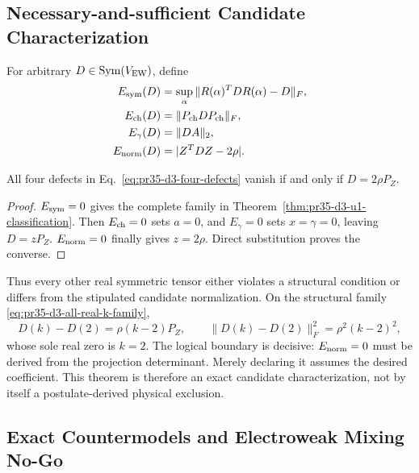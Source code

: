 \subsection{Necessary-and-sufficient Candidate Characterization}

For arbitrary $D\in\operatorname{Sym}(V_{\rm EW})$, define
\begin{align}
 E_{\rm sym}(D)&=\sup_{\alpha}
 \|R(\alpha)^TDR(\alpha)-D\|_F,\nonumber\\
 E_{\rm ch}(D)&=\|P_{\rm ch}DP_{\rm ch}\|_F,\nonumber\\
 E_{\gamma}(D)&=\|DA\|_2,\nonumber\\
 E_{\rm norm}(D)&=|Z^TDZ-2\rho|.
 \label{eq:pr35-d3-four-defects}
\end{align}

\begin{theorem}
\label{thm:pr35-d3-four-defect-certificate}
All four defects in Eq.~\eqref{eq:pr35-d3-four-defects} vanish if and only if
$D=2\rho P_Z$.
\end{theorem}

\begin{proof}
$E_{\rm sym}=0$ gives the complete family in
Theorem~\ref{thm:pr35-d3-u1-classification}.  Then $E_{\rm ch}=0$ sets $a=0$,
and $E_\gamma=0$ sets $x=\gamma=0$, leaving $D=zP_Z$.
$E_{\rm norm}=0$ finally gives $z=2\rho$.  Direct substitution proves the
converse.
\end{proof}

Thus every other real symmetric tensor either violates a structural condition
or differs from the stipulated candidate normalization.
On the structural family \eqref{eq:pr35-d3-all-real-k-family},
\begin{equation}
 D(k)-D(2)=\rho(k-2)P_Z,\qquad
 \|D(k)-D(2)\|_F^2=\rho^2(k-2)^2,
 \label{eq:pr35-d3-complete-real-defect}
\end{equation}
whose sole real zero is $k=2$.  The logical boundary is decisive:
$E_{\rm norm}=0$ must be derived from the projection determinant.  Merely
declaring it assumes the desired coefficient.  This theorem is therefore an
exact candidate characterization, not by itself a postulate-derived physical
exclusion.

\subsection{Exact Countermodels and Electroweak Mixing No-Go}


